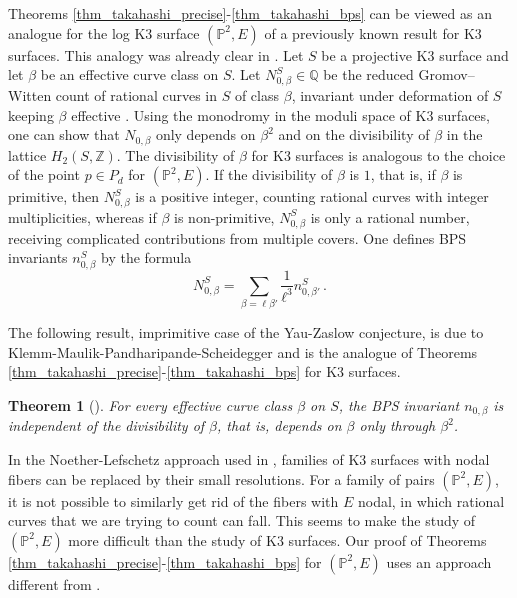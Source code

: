 \documentclass[11pt,letterpaper]{amsart}
\newtheorem{thm}[defn]{Theorem}
\newcommand\PP{\mathbb P}
\newcommand\Q{\mathbb Q}
\newcommand\Z{\mathbb Z}
\begin{document}
Theorems \ref{thm_takahashi_precise}-\ref{thm_takahashi_bps} can be viewed as an analogue for the log K3 surface $(\PP^2,E)$ of
a previously known result for K3 surfaces.
This analogy was already clear in \cite{takahashi9605007curves}.
Let $S$ be a projective K3 surface and let $\beta$ be an effective curve class on $S$. Let 
$N_{0,\beta}^S \in \Q$ be the reduced Gromov--Witten count of rational curves in $S$ of class $\beta$, invariant under deformation of $S$ keeping $\beta$ effective \cite{MR2746343}. 
Using the monodromy in the moduli space of K3 surfaces, one can show that $N_{0,\beta}$ only depends on 
$\beta^2$ and on the divisibility of 
$\beta$ in the lattice 
$H_2(S,\Z)$.
The divisibility of $\beta$ for K3 surfaces is analogous to the choice of the point $p \in P_d$ for $(\PP^2,E)$.
If the divisibility of $\beta$ is $1$, that is, 
if $\beta$ is primitive, then 
$N_{0,\beta}^S$ is a positive integer, counting rational curves with integer multiplicities, 
whereas if $\beta$ is non-primitive, $N_{0,\beta}^S$ is only a rational number, receiving complicated contributions from multiple covers.
One defines BPS invariants $n_{0,\beta}^S$
by the formula 
\[ N_{0,\beta}^S=\sum_{\beta=\ell \beta'}
\frac{1}{\ell^3}n_{0,\beta'}^S\,.\]

The following result, imprimitive case of the Yau-Zaslow conjecture, 
is due to
Klemm-Maulik-Pandharipande-Scheidegger
\cite{MR2669707} and  is the analogue of Theorems \ref{thm_takahashi_precise}-\ref{thm_takahashi_bps} for K3 surfaces.

\begin{thm}[\cite{MR2669707}]
For every effective curve class $\beta$ on $S$, the BPS invariant $n_{0,\beta}$ is independent of the divisibility of $\beta$, that is, depends on $\beta$
only through $\beta^2$.
\end{thm}

In the Noether-Lefschetz approach used in \cite{MR2669707}, 
families of K3 surfaces with nodal fibers can be replaced by their small resolutions. For a family of pairs $(\PP^2,E)$,
it is not possible to similarly get rid of the fibers with $E$ nodal, in which rational curves that we are trying to count can fall. 
This seems to make the study of $(\PP^2,E)$
more difficult than the study of K3 surfaces. Our proof of Theorems \ref{thm_takahashi_precise}-\ref{thm_takahashi_bps} for
$(\PP^2,E)$ uses an approach different from \cite{MR2669707}.
\end{document}
